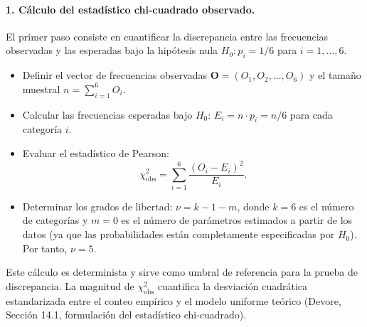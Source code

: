 \documentclass[12pt]{article}
\begin{document}
\paragraph{1. Cálculo del estadístico chi-cuadrado observado.}
El primer paso consiste en cuantificar la discrepancia entre las frecuencias observadas y las esperadas bajo la hipótesis nula $H_0: p_i = 1/6$ para $i = 1, \dots, 6$.
\begin{itemize}
    \item Definir el vector de frecuencias observadas $\mathbf{O} = (O_1, O_2, \dots, O_6)$ y el tamaño muestral $n = \sum_{i=1}^6 O_i$.
    \item Calcular las frecuencias esperadas bajo $H_0$: $E_i = n \cdot p_i = n/6$ para cada categoría $i$.
    \item Evaluar el estadístico de Pearson: 
    $$
    \chi^2_{\text{obs}} = \sum_{i=1}^6 \frac{(O_i - E_i)^2}{E_i}.
    $$
    \item Determinar los grados de libertad: $\nu = k - 1 - m$, donde $k=6$ es el número de categorías y $m=0$ es el número de parámetros estimados a partir de los datos (ya que las probabilidades están completamente especificadas por $H_0$). Por tanto, $\nu = 5$.
\end{itemize}
Este cálculo es determinista y sirve como umbral de referencia para la prueba de discrepancia. La magnitud de $\chi^2_{\text{obs}}$ cuantifica la desviación cuadrática estandarizada entre el conteo empírico y el modelo uniforme teórico (Devore, Sección 14.1, formulación del estadístico chi-cuadrado).
\end{document}
